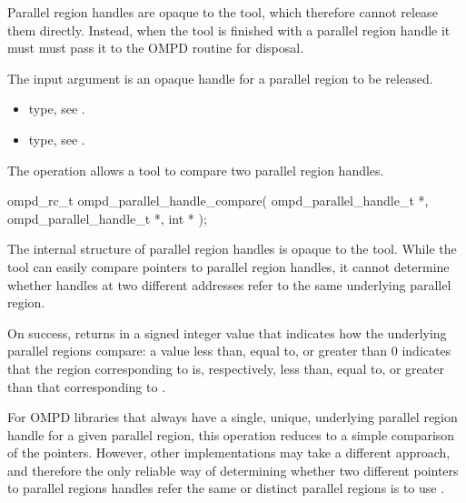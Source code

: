 \descr
Parallel region handles are opaque to the tool, which therefore
cannot release them directly. Instead, when the tool is finished with a parallel region handle
it must must pass it to the OMPD 
routine for disposal.

\argdesc
The input argument  is an opaque handle for a parallel region
to be released.

\crossreferences
\begin{itemize}
  \item {} type, see .
	\item {} type, see .
\end{itemize}

\label{subsubsubsec:ompd_parallel_handle_compare}
\summary
The  operation allows a tool to compare two
parallel region handles.

\format

\begin{cspecific}
\begin{ompSyntax}
ompd_rc_t ompd_parallel_handle_compare(
  ompd_parallel_handle_t *,
  ompd_parallel_handle_t *,
  int *
);
\end{ompSyntax}
\end{cspecific}


\descr
The internal structure of parallel region handles is opaque to the tool. While the tool can easily
compare pointers to parallel region handles, it cannot determine whether handles at two different
addresses refer to the same underlying parallel region.

On success,  returns in  a signed
integer value that indicates how the underlying parallel regions compare: a value less than, equal
to, or greater than 0 indicates that the region corresponding to  is,
respectively, less than, equal to, or greater than that corresponding to .

For OMPD libraries that always have a single, unique, underlying parallel region handle for
a given parallel region, this operation reduces to a simple comparison of the pointers. However,
other implementations may take a different approach, and therefore the only reliable way of
determining whether two different pointers to parallel regions handles refer the same or distinct
parallel regions is to use .

